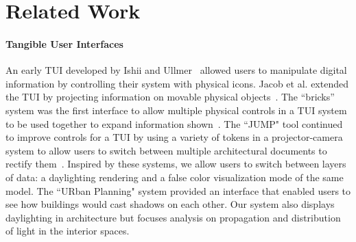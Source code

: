 \documentclass[10pt,twocolumn,letterpaper]{article}
\begin{document}
\section{Related Work}

\paragraph{Tangible User Interfaces}
%
An early TUI developed by Ishii and Ullmer~\cite{Ishii97tangiblebits}
allowed users to manipulate digital information by controlling their
system with physical icons.  Jacob et al. extended the TUI
by projecting information on movable physical
objects~\cite{Jacob01atangible}.  The ``bricks'' system was the first
interface to allow multiple physical controls in a TUI system to be
used together to expand information shown~\cite{223964}. 
%
%
The ``JUMP" tool continued to improve controls for a TUI by using a
variety of tokens in a projector-camera system to allow users to
switch between multiple architectural documents to rectify
them~\cite{1268540}.  
%
Inspired by these systems, we allow users to switch between layers of
data: a daylighting rendering and a false color visualization mode of
the same model. 
%
The ``URban Planning" system provided an interface that enabled users to
see how buildings would cast shadows on each
other\cite{Underkoffler:1999:ULW:302979.303114}.  Our system also
displays daylighting in architecture but focuses analysis on 
propagation and distribution of light in the interior spaces.




\vspace{-0.1in}
\end{document}
